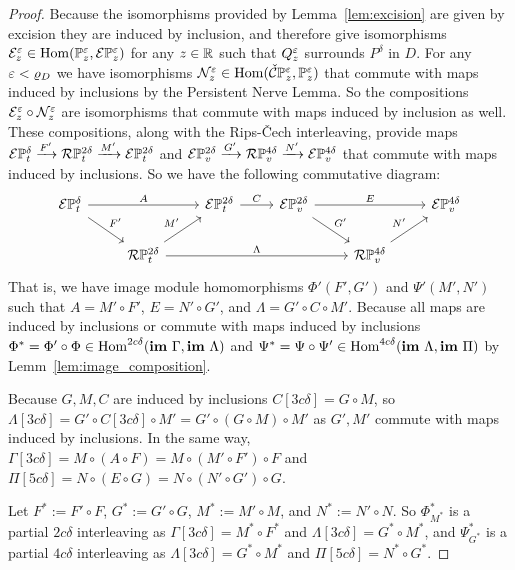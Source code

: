 \begin{proof}
  Because the isomorphisms provided by Lemma~\ref{lem:excision} are given by excision they are induced by inclusion, and therefore give isomorphisms $\mathcal{E}_z^\varepsilon \in \mathrm{Hom}(\mathbb{P}_{z}^{\varepsilon},\mathcal{E} \mathbb{P}_{z}^{\varepsilon})$ for any $z\in\mathbb{R}$ such that $Q_z^\varepsilon$ surrounds $P^\delta$ in $D$.
  For any $\varepsilon < \varrho_D$ we have isomorphisms $\mathcal{N}_z^\varepsilon\in\mathrm{Hom}(\check{\mathcal{C}}\mathbb{P}_{z}^{\varepsilon}, \mathbb{P}_{z}^{\varepsilon})$ that commute with maps induced by inclusions by the Persistent Nerve Lemma.
  So the compositions $\mathcal{E}_z^\varepsilon\circ \mathcal{N}_z^\varepsilon$ are isomorphisms that commute with maps induced by inclusion as well.
  These compositions, along with the Rips-\v Cech interleaving, provide maps $\mathcal{E}\mathbb{P}_{t}^{\delta}\xrightarrow{F'}\mathcal{R}\mathbb{P}_{t}^{2\delta}\xrightarrow{M'} \mathcal{E}\mathbb{P}_{t}^{2\delta}$ and $\mathcal{E}\mathbb{P}_{v}^{2\delta}\xrightarrow{G'}\mathcal{R}\mathbb{P}_{v}^{4\delta}\xrightarrow{N'} \mathcal{E}\mathbb{P}_{v}^{4\delta}$ that commute with maps induced by inclusions.
  So we have the following commutative diagram:
  \begin{equation}
    \begin{tikzcd}
      \E\PP{t}{\delta}\arrow{rr}{A}\arrow{dr}{F'} & &
      \E\PP{t}{2\delta}\arrow{r}{C} &
      \E\PP{v}{2\delta}\arrow{rr}{E}\arrow{dr}{G'} & &
      \E\PP{v}{4\delta}\\
      & \RPP{t}{2\delta}\arrow{ur}{M'}\arrow[to=RV, "\Lambda"] & &
      & |[alias=RV]|\RPP{v}{4\delta}\arrow{ur}{N'} &
    \end{tikzcd}
  \end{equation}
  That is, we have image module homomorphisms $\Phi'(F', G')$ and $\Psi'(M', N')$ such that $A = M'\circ F'$, $E = N'\circ G'$, and $\Lambda = G'\circ C\circ M'$.
  Because all maps are induced by inclusions or commute with maps induced by inclusions $\Phi^* = \Phi'\circ \Phi\in\mathrm{Hom}^{2c\delta}(\mathbf{im}~\Gamma, \mathbf{im}~\Lambda)$ and $\Psi^* = \Psi\circ\Psi'\in\mathrm{Hom}^{4c\delta}(\mathbf{im}~\Lambda, \mathbf{im}~\Pi)$ by Lemm~\ref{lem:image_composition}.

  Because $G,M,C$ are induced by inclusions $C[3c\delta] = G\circ M$, so $\Lambda[3c\delta] = G'\circ C[3c\delta]\circ M' = G'\circ (G\circ M)\circ M'$ as $G', M'$ commute with maps induced by inclusions.
  In the same way, $\Gamma[3c\delta] = M\circ (A\circ F) = M\circ (M'\circ F')\circ F$ and $\Pi[5c\delta] = N\circ (E\circ G) = N\circ (N'\circ G')\circ G$.

  Let $F^*:= F'\circ F$, $G^*:= G'\circ G$, $M^*:=M'\circ M$, and $N^*:=N'\circ N$.
  So $\Phi^*_{M^*}$ is a partial $2c\delta$ interleaving as $\Gamma[3c\delta] = M^*\circ F^*$ and $\Lambda[3c\delta] = G^*\circ M^*$, and $\Psi^*_{G^*}$ is a partial $4c\delta$ interleaving as $\Lambda[3c\delta] = G^*\circ M^*$ and $\Pi[5c\delta] = N^*\circ G^*$.
\end{proof}

